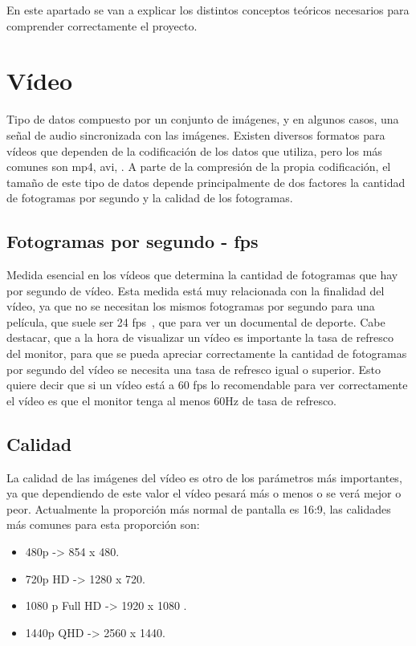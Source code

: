 
En este apartado se van a explicar los distintos conceptos teóricos necesarios para comprender correctamente el proyecto.

\section{Vídeo}
Tipo de datos compuesto por un conjunto de imágenes, y en algunos casos, una señal de audio sincronizada con las imágenes. Existen diversos formatos para vídeos que dependen de la codificación de los datos que utiliza, pero los más comunes son mp4, avi, . A parte de la compresión de la propia codificación, el tamaño de este tipo de datos depende principalmente de dos factores la cantidad de fotogramas por segundo y la calidad de los fotogramas.
\subsection{Fotogramas por segundo - fps}
Medida esencial en los vídeos que determina la cantidad de fotogramas que hay por segundo de vídeo. Esta medida está muy relacionada con la finalidad del vídeo, ya que no se necesitan los mismos fotogramas por segundo para una película, que suele ser 24 fps~\cite{fpscine}, que para ver un documental de deporte. Cabe destacar, que a la hora de visualizar un vídeo es importante la tasa de refresco del monitor, para que se pueda apreciar correctamente la cantidad de fotogramas por segundo del vídeo se necesita una tasa de refresco igual o superior. Esto quiere decir que si un vídeo está a 60 fps lo recomendable para ver correctamente el vídeo es que el monitor tenga al menos 60Hz de tasa de refresco.
\subsection{Calidad}
La calidad de las imágenes del vídeo es otro de los parámetros más importantes, ya que dependiendo de este valor el vídeo pesará más o menos o se verá mejor o peor. Actualmente la proporción más normal de pantalla es 16:9, las calidades más comunes para esta proporción son:
\begin{itemize}
	\item 480p -> 854 x 480.
	\item 720p HD -> 1280 x 720.
	\item 1080 p Full HD -> 1920 x 1080 .
	\item 1440p QHD -> 2560 x 1440.
\end{itemize}
